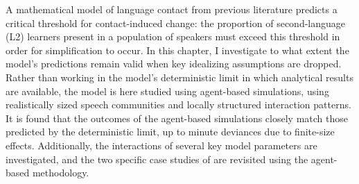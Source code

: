 A mathematical model of language contact from previous literature \parencite{Kauhanen2022} predicts a critical threshold for contact-induced change: the proportion of second-language (L2) learners present in a population of speakers must exceed this threshold in order for simplification to occur. In this chapter, I investigate to what extent the model's predictions remain valid when key idealizing assumptions are dropped. Rather than working in the model's deterministic limit in which analytical results are available, the model is here studied using agent-based simulations, using realistically sized speech communities and locally structured interaction patterns. It is found that the outcomes of the agent-based simulations closely match those predicted by the deterministic limit, up to minute deviances due to finite-size effects. Additionally, the interactions of several key model parameters are investigated, and the two specific case studies of \textcite{Kauhanen2022} are revisited using the agent-based methodology.
